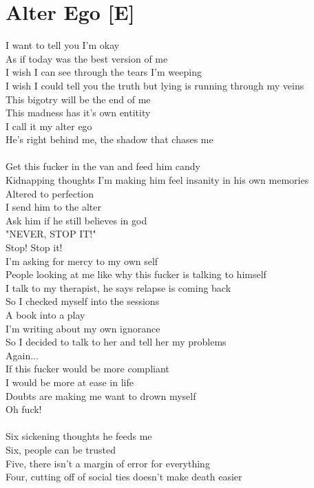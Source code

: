 \documentclass[12pt, b5paper, oneside]{book}
\begin{document}
\section{Alter Ego [E]}
I want to tell you I'm okay
\\As if today was the best version of me
\\I wish I can see through the tears I'm weeping
\\I wish I could tell you the truth but lying is running through my veins
\\This bigotry will be the end of me
\\This madness has it's own entitity
\\I call it my alter ego
\\He's right behind me, the shadow that chases me
%
\\\\Get this fucker in the van and feed him candy
\\Kidnapping thoughts I'm making him feel insanity in his own memories
\\Altered to perfection
\\I send him to the alter
\\Ask him if he still believes in god
\\"NEVER, STOP IT!"
\\Stop! Stop it!
\\I'm asking for mercy to my own self
\\People looking at me like why this fucker is talking to himself
\\I talk to my therapist, he says relapse is coming back
\\So I checked myself into the sessions
\\A book into a play
\\I'm writing about my own ignorance
\\So I decided to talk to her and tell her my problems
\\Again...
\\If this fucker would be more compliant
\\I would be more at ease in life
\\Doubts are making me want to drown myself
\\Oh fuck!
%
\\\\Six sickening thoughts he feeds me
\\Six, people can be trusted
\\Five, there isn't a margin of error for everything
\\Four, cutting off of social ties doesn't make death easier
\end{document}
